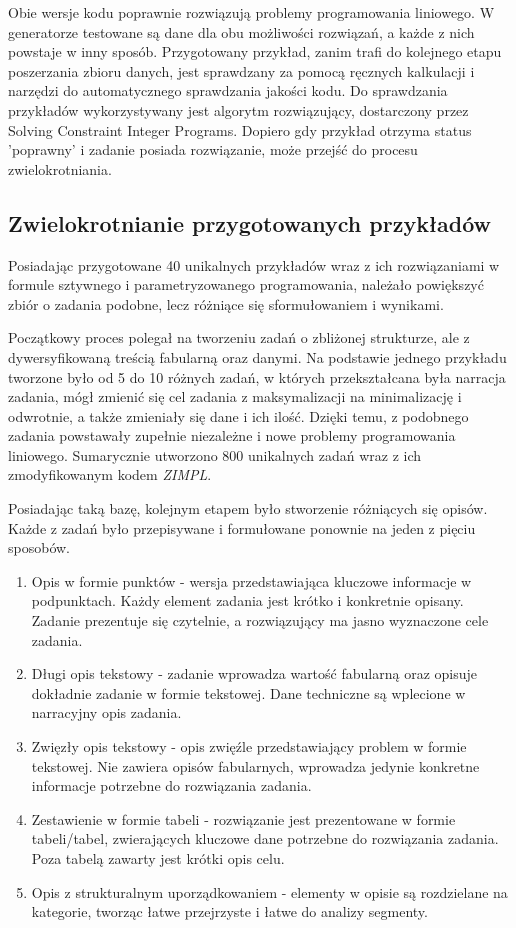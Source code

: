 Obie wersje kodu poprawnie rozwiązują problemy programowania liniowego. W generatorze testowane są dane dla obu możliwości rozwiązań, a każde z nich powstaje w inny sposób. Przygotowany przykład, zanim trafi do kolejnego etapu poszerzania zbioru danych, jest sprawdzany za pomocą ręcznych kalkulacji i narzędzi do automatycznego sprawdzania jakości kodu. Do sprawdzania przykładów wykorzystywany jest algorytm rozwiązujący, dostarczony przez Solving Constraint Integer Programs. Dopiero gdy przykład otrzyma status 'poprawny' i zadanie posiada rozwiązanie, może przejść do procesu zwielokrotniania.

\subsection{Zwielokrotnianie przygotowanych przykładów}

Posiadając przygotowane 40 unikalnych przykładów wraz z ich rozwiązaniami w formule sztywnego i parametryzowanego programowania, należało powiększyć zbiór o zadania podobne, lecz różniące się sformułowaniem i wynikami.

Początkowy proces polegał na tworzeniu zadań o zbliżonej strukturze, ale z dywersyfikowaną treścią fabularną oraz danymi. Na podstawie jednego przykładu tworzone było od 5 do 10 różnych zadań, w których przekształcana była narracja zadania, mógł zmienić się cel zadania z maksymalizacji na minimalizację i odwrotnie, a także zmieniały się dane i ich ilość. Dzięki temu, z podobnego zadania powstawały zupełnie niezależne i nowe problemy programowania liniowego. Sumarycznie utworzono 800 unikalnych zadań wraz z ich zmodyfikowanym kodem  \textit{ZIMPL}.

Posiadając taką bazę, kolejnym etapem było stworzenie różniących się opisów. Każde z zadań było przepisywane i formułowane ponownie na jeden z pięciu sposobów.

\begin{enumerate}
\item Opis w formie punktów - wersja przedstawiająca kluczowe informacje w podpunktach. Każdy element zadania jest krótko i konkretnie opisany. Zadanie prezentuje się czytelnie, a rozwiązujący ma jasno wyznaczone cele zadania.
\item Długi opis tekstowy - zadanie wprowadza wartość fabularną oraz opisuje dokładnie zadanie w formie tekstowej. Dane techniczne są wplecione w narracyjny opis zadania.
\item Zwięzły opis tekstowy - opis zwięźle przedstawiający problem w formie tekstowej. Nie zawiera opisów fabularnych, wprowadza jedynie konkretne informacje potrzebne do rozwiązania zadania.
\item Zestawienie w formie tabeli - rozwiązanie jest prezentowane w formie tabeli/tabel, zwierających kluczowe dane potrzebne do rozwiązania zadania. Poza tabelą zawarty jest krótki opis celu.
\item Opis z strukturalnym uporządkowaniem - elementy w opisie są rozdzielane na kategorie, tworząc łatwe przejrzyste i łatwe do analizy segmenty.
\end{enumerate}

